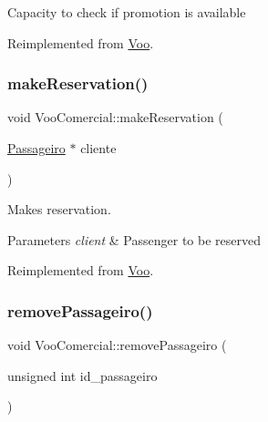 Capacity to check if promotion is available 

Reimplemented from \hyperlink{class_voo_abe4f7816ae9132314e0288e7b8a077d8}{Voo}.

\mbox{\label{class_voo_comercial_ad72f20dbbaa0862e100b4f7b4ebf78d2}} 
\subsubsection{\texorpdfstring{make\+Reservation()}{makeReservation()}}
{\footnotesize\ttfamily void Voo\+Comercial\+::make\+Reservation (\begin{DoxyParamCaption}\item[{\hyperlink{class_passageiro}{Passageiro} $\ast$}]{cliente }\end{DoxyParamCaption})\hspace{0.3cm}{\ttfamily [virtual]}}



Makes reservation. 


\begin{DoxyParams}{Parameters}
{\em client} & Passenger to be reserved \\
\hline
\end{DoxyParams}


Reimplemented from \hyperlink{class_voo_aa308fcf651fdf54b0a03e881c6d8fea4}{Voo}.

\mbox{\label{class_voo_comercial_a7e9904d20f1dc6908d98d7ccebd1fbb2}} 
\subsubsection{\texorpdfstring{remove\+Passageiro()}{removePassageiro()}}
{\footnotesize\ttfamily void Voo\+Comercial\+::remove\+Passageiro (\begin{DoxyParamCaption}\item[{unsigned int}]{id\+\_\+passageiro }\end{DoxyParamCaption})\hspace{0.3cm}{\ttfamily [virtual]}}



